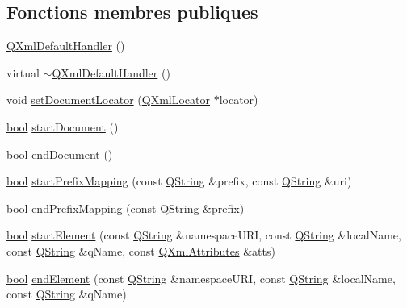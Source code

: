 \subsection*{Fonctions membres publiques}
\begin{DoxyCompactItemize}
\item 
\hyperlink{class_q_xml_default_handler_a97addb49dd76cb81b223c45e381f3933}{Q\+Xml\+Default\+Handler} ()
\item 
virtual \hyperlink{class_q_xml_default_handler_a6b048432047efce5fcdd88855e95c3b9}{$\sim$\+Q\+Xml\+Default\+Handler} ()
\item 
void \hyperlink{class_q_xml_default_handler_add9860b32800232e14f6d4150ed23937}{set\+Document\+Locator} (\hyperlink{class_q_xml_locator}{Q\+Xml\+Locator} $\ast$locator)
\item 
\hyperlink{qglobal_8h_a1062901a7428fdd9c7f180f5e01ea056}{bool} \hyperlink{class_q_xml_default_handler_a5a1135641cb81d4053ecd4783c7c252b}{start\+Document} ()
\item 
\hyperlink{qglobal_8h_a1062901a7428fdd9c7f180f5e01ea056}{bool} \hyperlink{class_q_xml_default_handler_a57ed6d87a89653619ff0d56078c52061}{end\+Document} ()
\item 
\hyperlink{qglobal_8h_a1062901a7428fdd9c7f180f5e01ea056}{bool} \hyperlink{class_q_xml_default_handler_a5f8b32143da1251f62c64df4742df77c}{start\+Prefix\+Mapping} (const \hyperlink{class_q_string}{Q\+String} \&prefix, const \hyperlink{class_q_string}{Q\+String} \&uri)
\item 
\hyperlink{qglobal_8h_a1062901a7428fdd9c7f180f5e01ea056}{bool} \hyperlink{class_q_xml_default_handler_a8e0cf92238c12e8776711bb4fb0ca4cf}{end\+Prefix\+Mapping} (const \hyperlink{class_q_string}{Q\+String} \&prefix)
\item 
\hyperlink{qglobal_8h_a1062901a7428fdd9c7f180f5e01ea056}{bool} \hyperlink{class_q_xml_default_handler_a0381a337b32a16d2ef2a8df9a29cb215}{start\+Element} (const \hyperlink{class_q_string}{Q\+String} \&namespace\+U\+R\+I, const \hyperlink{class_q_string}{Q\+String} \&local\+Name, const \hyperlink{class_q_string}{Q\+String} \&q\+Name, const \hyperlink{class_q_xml_attributes}{Q\+Xml\+Attributes} \&atts)
\item 
\hyperlink{qglobal_8h_a1062901a7428fdd9c7f180f5e01ea056}{bool} \hyperlink{class_q_xml_default_handler_ae5d92a2fbae15a793aedf725b62b16c2}{end\+Element} (const \hyperlink{class_q_string}{Q\+String} \&namespace\+U\+R\+I, const \hyperlink{class_q_string}{Q\+String} \&local\+Name, const \hyperlink{class_q_string}{Q\+String} \&q\+Name)

\end{DoxyCompactItemize}
